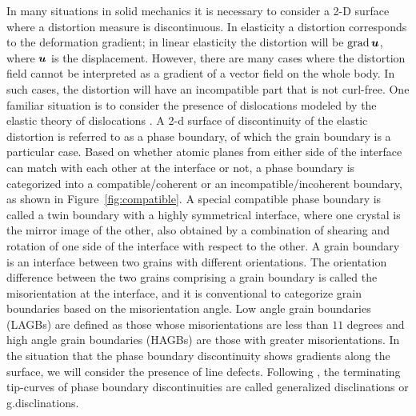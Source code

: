 \documentclass[11pt,letterpaper]{article}
\begin{document}
In many situations in solid mechanics it is necessary to consider a 2-D surface where a distortion measure is discontinuous. In elasticity a distortion corresponds to the deformation gradient; in linear elasticity the distortion will be $\grad \bfu$, where $\bfu$ is the displacement. However, there are many cases where the distortion field cannot be interpreted as a gradient of a vector field on the whole body. In such cases, the distortion will have an incompatible part that is not curl-free. One familiar situation  is to consider the presence of dislocations modeled by the elastic theory of dislocations \cite{kroner1981continuum, willis1967second}.  A 2-d surface of discontinuity of the elastic distortion is referred to as a phase boundary, of which the grain boundary is a particular case.  Based on whether atomic planes from either side of the interface can match with each other at the interface or not, a phase boundary is categorized into a compatible/coherent or an incompatible/incoherent boundary, as shown in Figure~\ref{fig:compatible}. A special compatible phase boundary is called a twin boundary with a highly symmetrical interface, where one crystal is the mirror image of the other, also obtained by a combination of shearing and rotation of one side of the interface with respect to the other. A grain boundary is an interface between two grains with different orientations. The orientation difference between the two grains comprising a grain boundary is called the misorientation at the interface, and it is conventional to categorize grain boundaries based on the misorientation angle. Low angle grain boundaries (LAGBs) are defined as those whose misorientations are less than $11$ degrees and high angle grain boundaries (HAGBs) are those with greater misorientations. In the situation that the phase boundary discontinuity shows gradients along the surface, we will consider the presence of line defects. Following \cite{acharya2012coupled, acharya2015continuum},  the terminating tip-curves of phase boundary discontinuities are called generalized disclinations or g.disclinations.
\end{document}
